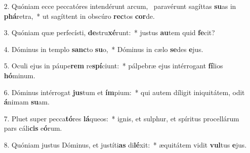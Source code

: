 2. Quóniam ecce peccatóres intendérunt arcum, \dag\  paravérunt sagíttas \textbf{su}as in \textbf{phá}retra,~*  ut sagíttent in obscúro \textbf{rec}tos \textbf{cor}de.\

3. Quóniam quæ perfecísti, \textbf{de}stru\textbf{xé}runt:~*  justus \textbf{au}tem quid \textbf{fe}cit?\

4. Dóminus in templo \textbf{sanc}to \textbf{su}o,~*  Dóminus in cælo \textbf{se}des \textbf{e}jus.\

5. Oculi ejus in páupe\textbf{rem} re\textbf{spí}ciunt:~*  pálpebræ ejus intérrogant \textbf{fí}lios \textbf{hó}minum.\

6. Dóminus intérrogat \textbf{jus}tum et \textbf{ím}pium:~*  qui autem díligit iniquitátem, odit \textbf{á}nimam \textbf{su}am.\

7. Pluet super pecca\textbf{tó}res \textbf{lá}queos:~*  ignis, et sulphur, et spíritus procellárum pars cáli\textbf{cis} e\textbf{ó}rum.\

8. Quóniam justus Dóminus, et justíti\textbf{as} di\textbf{lé}xit:~*  æquitátem vidit \textbf{vul}tus \textbf{e}jus.\

